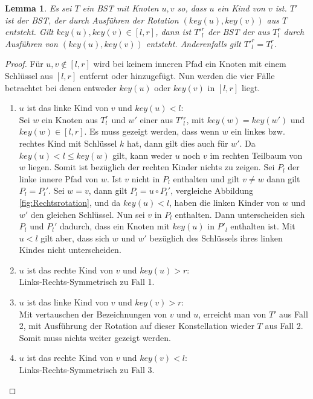 \documentclass[a4paper,12pt]{article}
\newtheorem{Lemma}{Lemma}[section]
\begin{document}
\begin{Lemma}  \label{lemmaWilber1} Es sei $T$ ein BST mit Knoten $u, v$ so, dass $u$ ein Kind von $v$ ist. $T'$ ist der BST, der durch Ausführen der Rotation $\left(\mathit{key}\left(u\right),\mathit{key}\left(v\right)\right)$ aus $T$ entsteht. Gilt $\mathit{key}\left(u\right),\mathit{key}\left(v\right) \in \left[l,r\right]$, dann ist ${T'}^r_l$ der BST der aus $T^r_l$ durch Ausführen von  $\left(\mathit{key}\left(u\right),\mathit{key}\left(v\right)\right)$ entsteht. Anderenfalls gilt ${T'}^r_l = T^r_l$.
\end{Lemma}
\begin{proof}
	\noindent Für $u,v \notin \left[l,r\right]$ wird bei keinem inneren Pfad ein Knoten mit einem Schlüssel aus $\left[l,r\right]$ entfernt oder hinzugefügt.
	Nun werden die vier Fälle betrachtet bei denen entweder $\mathit{key}\left(u\right)$ oder $\mathit{key}\left(v\right)$ in $\left[l,r\right]$ liegt.
	\begin{enumerate}
		\item $u$ ist das linke Kind von $v$ und $\mathit{key}\left(u\right) < l$:\\
		Sei $w$ ein Knoten aus $T^r_l$ und $w'$ einer aus $T'{^r_l}$, mit $\mathit{key}(w) = \mathit{key}(w')$ und $\mathit{key}(w) \in \left[l,r\right]$. Es muss gezeigt werden, dass wenn $w$ ein linkes bzw. rechtes Kind mit Schlüssel $k$ hat, dann gilt dies auch für $w'$. Da $\mathit{key}(u) < l \leq \mathit{key}(w) $ gilt, kann weder $u$ noch $v$ im rechten Teilbaum von $w$ liegen. Somit ist bezüglich der rechten Kinder nichts zu zeigen. 
		Sei $P_l$ der linke innere Pfad von $w$. Ist $v$ nicht in $P_l$ enthalten und gilt $v \neq w$ dann gilt $P_l = P{_l}'$. Sei $w = v$, dann gilt $P_l = u  \circ  {P_l}'$, vergleiche Abbildung \ref{fig:Rechtsrotation}, und da $\mathit{key}(u) < l$, haben die linken Kinder von $w$ und $w'$ den gleichen Schlüssel. Nun sei $v$ in $P_l$ enthalten. Dann unterscheiden sich  $P_l$ und  ${P_l}'$ dadurch, dass ein Knoten mit $\mathit{key}(u)$ in $P'_l$ enthalten ist. Mit $u < l$ gilt aber, dass sich $w$ und $w'$ bezüglich des Schlüssels ihres linken Kindes nicht unterscheiden.
	   	\item $u$ ist das rechte Kind von $v$ und $\mathit{key}\left(u\right) > r$:\\
	    Links-Rechts-Symmetrisch zu Fall 1. 	
		\item $u$ ist das linke Kind von $v$ und $\mathit{key}\left(v\right) > r$:\\
		Mit vertauschen der Bezeichnungen von $v$ und $u$, erreicht man von $T'$ aus Fall 2, mit Ausführung der Rotation auf dieser Konstellation wieder $T$ aus Fall 2. Somit muss nichts weiter gezeigt werden. 
		\item $u$ ist das rechte Kind von $v$ und $\mathit{key}\left(v\right) < l$:\\
		Links-Rechts-Symmetrisch zu Fall 3. \\
		

\end{enumerate}
\end{proof}
\end{document}
